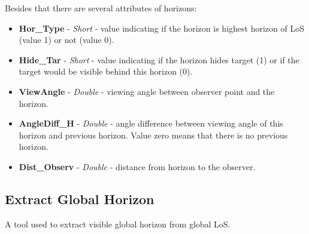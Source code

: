 \documentclass[]{article}
\begin{document}
Besides that there are several attributes of horizons:
\begin{itemize}
	\item \textbf{Hor\_Type} - \textit{Short} - value indicating if the horizon is highest horizon of LoS (value 1) or not (value 0).
	\item \textbf{Hide\_Tar} - \textit{Short} - value indicating if the horizon hides target (1) or if the target would be visible behind this horizon (0).
	\item \textbf{ViewAngle} - \textit{Double} - viewing angle between observer point and the horizon.
	\item \textbf{AngleDiff\_H} - \textit{Double} - angle difference between viewing angle of this horizon and previous horizon. Value zero means that there is no previous horizon.
	\item \textbf{Dist\_Observ} - \textit{Double} - distance from horizon to the observer.
\end{itemize}

\subsection{Extract Global Horizon}

A tool used to extract visible global horizon from global LoS. 
\end{document}
